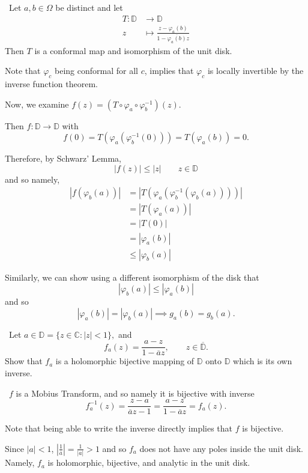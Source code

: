 \documentclass[12pt]{Qual}
\begin{document}
\begin{solution}$\,$
Let $a,b\in\Omega$ be distinct and let \begin{align*}
    T:\mathbb{D}&\to\mathbb{D}\\
    z&\mapsto\frac{z-\varphi_a(b)}{1-\overline{\varphi_a(b)}z}
\end{align*} Then $T$ is a conformal map and isomorphism of the unit disk.

Note that $\varphi_c$ being conformal for all $c$, implies that $\varphi_c$ is locally invertible by the inverse function theorem.

 Now, we examine $f(z)=(T\circ\varphi_a\circ\varphi_b^{-1})(z)$.

Then $f:\mathbb{D}\to\mathbb{D}$ with $$f(0)=T(\varphi_a(\varphi_b^{-1}(0)))=T(\varphi_a(b))=0.$$

Therefore, by Schwarz' Lemma, $$|f(z)|\le|z|\qquad z\in\mathbb{D}$$ and so namely, \begin{align*}
    |f(\varphi_b(a))|&=|T(\varphi_a(\varphi_b^{-1}(\varphi_b(a))))|\\
    &=|T(\varphi_a(a))|\\
    &=|T(0)|\\
    &=|\varphi_a(b)|\\
    &\le|\varphi_b(a)|
\end{align*}

Similarly, we can show using a different isomorphism of the disk that $$|\varphi_b(a)|\le|\varphi_a(b)|$$ and so $$|\varphi_a(b)|=|\varphi_b(a)|\implies g_a(b)=g_b(a).$$
\end{solution}
\newpage





\begin{problem} $\,$
Let $a\in\mathbb{D}=\{z\in\mathbb{C}:|z|<1\},$ and $$f_a(z)=\frac{a-z}{1-\overline{a}z},\qquad z\in\overline{\mathbb{D}}.$$ Show that $f_a$ is a holomorphic bijective mapping of $\mathbb{D}$  onto $\mathbb{D}$ which is its own inverse.
\end{problem}


\begin{solution}$\,$
$f$ is a Mobius Transform, and so namely it is bijective with inverse $$f_a^{-1}(z)=\frac{z-a}{\overline{a}z-1}=\frac{a-z}{1-\overline{a}z}=f_a(z).$$

Note that being able to write the inverse directly implies that $f$ is bijective.

Since $|a|<1$, $\left|\frac{1}{\overline{a}}\right|=\frac{1}{|a|}>1$ and so $f_a$ does not have any poles inside the unit disk. Namely, $f_a$ is holomorphic, bijective, and analytic in the unit disk.
\end{solution}
\end{document}
